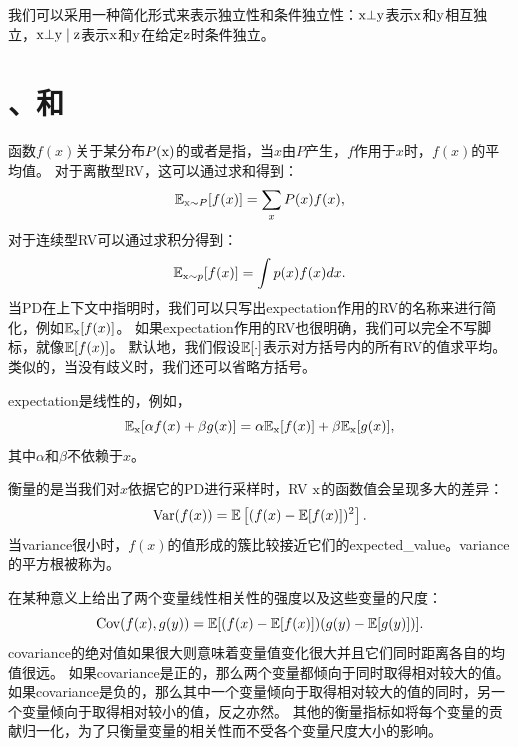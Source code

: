我们可以采用一种简化形式来表示独立性和条件独立性：$\mathrm{x} \bot \mathrm{y}$表示$\mathrm{x}$和$\mathrm{y}$相互独立，$\mathrm{x} \bot \mathrm{y} \mid \mathrm{z}$表示$\mathrm{x}$和$\mathrm{y}$在给定$\mathrm{z}$时条件独立。

\section{、和}
\label{sec:expectation_variance_and_covariance}

函数$f(x)$关于某分布$P(\mathrm{x})$的或者是指，当$x$由$P$产生，$f$作用于$x$时，$f(x)$的平均值。
对于离散型\gls{RV}，这可以通过求和得到：
\begin{equation}
\mathbb{E}_{\mathrm{x} \sim P}[f(x)] = \sum_x P(x)f(x),
\end{equation}
对于连续型\gls{RV}可以通过求积分得到：
\begin{equation}
\mathbb{E}_{\mathrm{x} \sim p}[f(x)] = \int p(x)f(x)dx.
\end{equation}
当\gls{PD}在上下文中指明时，我们可以只写出\gls{expectation}作用的\gls{RV}的名称来进行简化，例如$\mathbb{E}_{\mathrm{x}}[f(x)]$。
如果\gls{expectation}作用的\gls{RV}也很明确，我们可以完全不写脚标，就像$\mathbb{E}[f(x)]$。
默认地，我们假设$\mathbb{E}[\cdot]$表示对方括号内的所有\gls{RV}的值求平均。
类似的，当没有歧义时，我们还可以省略方括号。


\gls{expectation}是线性的，例如，
\begin{equation}
\mathbb{E}_{\mathrm{x}}[\alpha f(x) + \beta g(x)] = \alpha \mathbb{E}_{\mathrm{x}}[f(x)] + \beta \mathbb{E}_{\mathrm{x}}[g(x)],
\end{equation}
其中$\alpha$和$\beta$不依赖于$x$。

衡量的是当我们对$x$依据它的\gls{PD}进行采样时，\gls{RV} $\mathrm{x}$的函数值会呈现多大的差异：
\begin{equation}
\text{Var}(f(x)) = \mathbb{E} \left [(f(x) - \mathbb{E}[f(x)])^2 \right].
\end{equation}
当\gls{variance}很小时，$f(x)$的值形成的簇比较接近它们的\gls{expected_value}。\gls{variance}的平方根被称为。

在某种意义上给出了两个变量线性相关性的强度以及这些变量的尺度：
\begin{equation}
\text{Cov}(f(x), g(y)) = \mathbb{E}[ ( f(x)-\mathbb{E}[f(x)] )( g(y)-\mathbb{E}[g(y)] ) ].
\end{equation}
\gls{covariance}的绝对值如果很大则意味着变量值变化很大并且它们同时距离各自的均值很远。
如果\gls{covariance}是正的，那么两个变量都倾向于同时取得相对较大的值。
如果\gls{covariance}是负的，那么其中一个变量倾向于取得相对较大的值的同时，另一个变量倾向于取得相对较小的值，反之亦然。
其他的衡量指标如将每个变量的贡献归一化，为了只衡量变量的相关性而不受各个变量尺度大小的影响。

